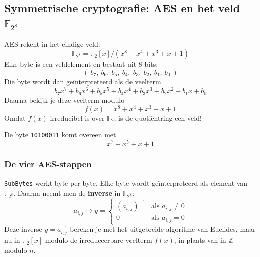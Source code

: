 \subsection{Symmetrische cryptografie: AES en het veld \texorpdfstring{$\mathbb{F}_{2^8}$}{F2-8}}

AES rekent in het eindige veld:
\begin{equation*}
    \mathbb{F}_{2^8} = \mathbb{F}_2[x]/\left(x^8 + x^4 + x^3 + x + 1\right)
\end{equation*}
Elke byte is een veldelement en bestaat uit 8 bits:
\begin{equation*}
    \left(\ b_7,\ b_6,\ b_5,\ b_4,\ b_3,\ b_2,\ b_1,\ b_0 \ \right)
\end{equation*}
Die byte wordt dan geïnterpreteerd als de veelterm
\begin{equation*}
    b_7x^7 + b_6x^6 + b_5x^5 + b_4x^4 + b_3x^3 + b_2x^2 + b_1x + b_0
\end{equation*}
Daarna bekijk je deze veelterm modulo
\begin{equation*}
    f(x) = x^8 + x^4 + x^3 + x + 1
\end{equation*}
Omdat $f(x)$ irreducibel is over $\mathbb{F}_2$, is de quotiëntring een veld!

\textbf{} De byte \texttt{10100011} komt overeen met
\begin{equation*}
    x^7 + x^5 + x + 1
\end{equation*}

\subsubsection{De vier AES-stappen}


\texttt{SubBytes} werkt byte per byte. Elke byte wordt geïnterpreteerd als element van $\mathbb{F}_{2^8}$. Daarna neemt men de \textbf{inverse} in $\mathbb{F}_{2^8}$:
\begin{equation*}
    a_{i,j} \mapsto y = \begin{cases}
        (a_{i,j})^{-1} & \text{als } a_{i,j} \neq 0 \\
        0 & \text{als } a_{i,j} = 0
    \end{cases}
\end{equation*}
 Deze inverse $y = a_{i,j}^{-1}$ bereken je met het uitgebreide algoritme van Euclides, maar nu in $\mathbb{F}_2[x]$ modulo de irreduceerbare veelterm $f(x)$, in plaats van in $\mathbb{Z}$ modulo $n$.

